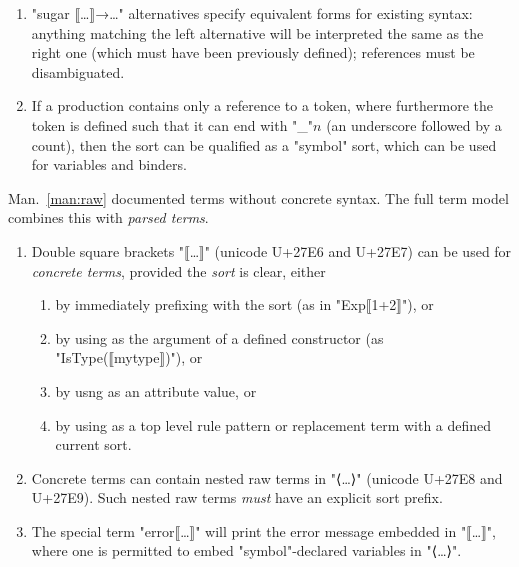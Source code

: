 \documentclass[11pt]{article} %
\begin{document}
\begin{manual}
\begin{enumerate}
  \item "sugar ⟦…⟧→…" alternatives specify equivalent forms for existing syntax: anything matching
    the left alternative will be interpreted the same as the right one (which must have been
    previously defined); references must be disambiguated.

  \item If a production contains only a reference to a token, where furthermore the token is defined
    such that it can end with "_"$n$ (an underscore followed by a count), then the sort can be
    qualified as a "symbol" sort, which can be used for variables and binders.

  \end{enumerate}
\end{manual}

\begin{manual}\label{man:parsed}
  Man.~\ref{man:raw} documented terms without concrete syntax. The full term model combines this
  with \emph{parsed terms}.
  \begin{enumerate}

  \item Double square brackets "⟦…⟧" (unicode U+27E6 and U+27E7) can be used for \emph{concrete
      terms}, provided the \emph{sort} is clear, either
    \begin{enumerate}
    \item by immediately prefixing with the sort (as in "Exp⟦1+2⟧"), or
    \item by using as the argument of a defined constructor (as "IsType(⟦mytype⟧)"), or
    \item by usng as an attribute value, or
    \item by using as a top level rule pattern or replacement term with a defined current sort.
    \end{enumerate}

  \item Concrete terms can contain nested raw terms in "⟨…⟩" (unicode U+27E8 and U+27E9). Such
    nested raw terms \emph{must} have an explicit sort prefix.

  \item The special term "error⟦…⟧" will print the error message embedded in "⟦…⟧", where one is
    permitted to embed "symbol"-declared variables in "⟨…⟩".

  \end{enumerate}

\end{manual}
\end{document}
